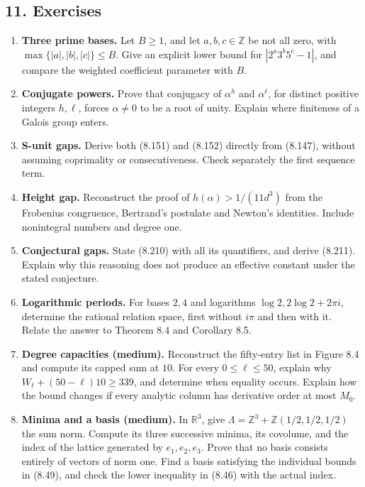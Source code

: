 \documentclass[
  11pt,
  a4paper,
]{article}
\providecommand{\tightlist}{%
  \setlength{\itemsep}{0pt}\setlength{\parskip}{0pt}}
\begin{document}
\subsection{11. Exercises}\label{exercises}

\begin{enumerate}
\def\labelenumi{\arabic{enumi}.}
\tightlist
\item
  \textbf{Three prime bases.} Let \(B\ge1\), and let
  \(a,b,c\in\mathbb Z\) be not all zero, with
  \(\max\{|a|,|b|,|c|\}\le B\). Give an explicit lower bound for
  \(|2^a3^b5^c-1|\), and compare the weighted coefficient parameter with
  \(B\).
\item
  \textbf{Conjugate powers.} Prove that conjugacy of \(\alpha^h\) and
  \(\alpha^\ell\), for distinct positive integers \(h,\ell\), forces
  \(\alpha\ne0\) to be a root of unity. Explain where finiteness of a
  Galois group enters.
\item
  \textbf{S-unit gaps.} Derive both (8.151) and (8.152) directly from
  (8.147), without assuming coprimality or consecutiveness. Check
  separately the first sequence term.
\item
  \textbf{Height gap.} Reconstruct the proof of \(h(\alpha)>1/(11d^3)\)
  from the Frobenius congruence, Bertrand's postulate and Newton's
  identities. Include nonintegral numbers and degree one.
\item
  \textbf{Conjectural gaps.} State (8.210) with all its quantifiers, and
  derive (8.211). Explain why this reasoning does not produce an
  effective constant under the stated conjecture.
\item
  \textbf{Logarithmic periods.} For bases \(2,4\) and logarithms
  \(\log2,2\log2+2\pi i\), determine the rational relation space, first
  without \(i\pi\) and then with it. Relate the answer to Theorem 8.4
  and Corollary 8.5.
\item
  \textbf{Degree capacities (medium).} Reconstruct the fifty-entry list
  in Figure 8.4 and compute its capped sum at \(10\). For every
  \(0\le\ell\le50\), explain why \(W_\ell+(50-\ell)10\ge339\), and
  determine when equality occurs. Explain how the bound changes if every
  analytic column has derivative order at most \(M_0\).
\item
  \textbf{Minima and a basis (medium).} In \(\mathbb R^3\), give
  \(\Lambda=\mathbb Z^3+\mathbb Z(1/2,1/2,1/2)\) the sum norm. Compute
  its three successive minima, its covolume, and the index of the
  lattice generated by \(e_1,e_2,e_3\). Prove that no basis consists
  entirely of vectors of norm one. Find a basis satisfying the
  individual bounds in (8.49), and check the lower inequality in (8.46)
  with the actual index.
\end{enumerate}
\end{document}
